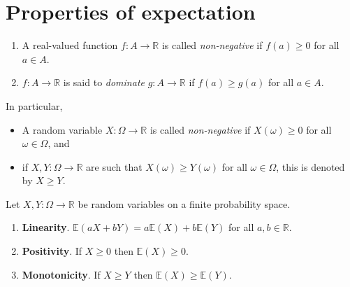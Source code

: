 \documentclass[lecture]{csm}
\newcommand{\R}{\mathbb{R}}
\newcommand{\expe}{\mathbb{E}}
\def\it{\item}
\def\bit{\begin{itemize}}
\def\eit{\end{itemize}}
\def\ben{\begin{enumerate}}
\def\een{\end{enumerate}}
\begin{document}
\section{Properties of expectation}
\begin{definition}
\ben
\it A real-valued function $f:A\to\R$ is called \emph{non-negative} if $f(a)\geq 0$ for all $a\in A$.
\it $f:A\to\R$ is said to \emph{dominate} $g:A\to\R$ if $f(a)\geq g(a)$ for all $a\in A$.
\een
In particular,
\bit
\it A random variable $X:\Omega\to\R$ is called \emph{non-negative} if $X(\omega)\geq 0$ for all $\omega\in\Omega$, and
\it if $X,Y:\Omega\to\R$ are such that $X(\omega)\geq Y(\omega)$ for all $\omega\in\Omega$, this is denoted by $X\geq Y$.
\eit
\end{definition}

\begin{theorem}
Let $X,Y:\Omega\to\R$ be random variables on a finite probability space.
\ben
\it\textbf{Linearity}.
$\expe(aX+bY) = a\expe(X) + b\expe(Y)$ for all $a,b\in\R$.
\it\textbf{Positivity}. 
If $X\geq 0$ then $\expe(X)\geq 0$.
\it\textbf{Monotonicity}.
If $X\geq Y$ then $\expe(X)\geq\expe(Y)$.
\een
\end{theorem}

\break %
\end{document}
